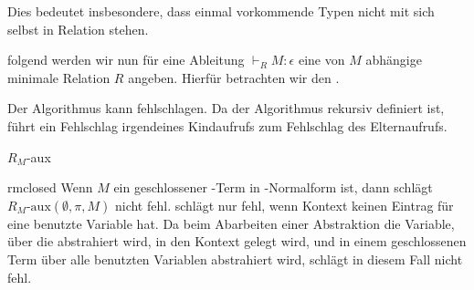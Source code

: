 \begin{remark}
    Dies bedeutet insbesondere, dass einmal vorkommende Typen nicht mit sich selbst in Relation stehen.
\end{remark}

 folgend werden wir nun für eine Ableitung $\vdash_R M : \epsilon$ eine von $M$ abhängige minimale Relation $R$ angeben. Hierfür betrachten wir den . 
\begin{remark}
    Der Algorithmus kann fehlschlagen. Da der Algorithmus rekursiv definiert ist, führt ein Fehlschlag irgendeines Kindaufrufs zum Fehlschlag des Elternaufrufs.
\end{remark}

\begin{algorithm}[t]
    \DontPrintSemicolon
\caption{$R_M$-aux}
\label{alg:rm}
\end{algorithm}

\begin{lemma}{}{rmclosed}
    Wenn $M$ ein geschlossener \tlambda-Term in \tbeta-Normalform ist, dann schlägt $R_M\text{-aux}(\emptyset,\pi,M)$ nicht fehl.
    \Proof
     schlägt nur fehl, wenn Kontext keinen Eintrag für eine benutzte Variable hat. Da beim Abarbeiten einer Abstraktion die Variable, über die abstrahiert wird, in den Kontext gelegt wird, und in einem geschlossenen Term über alle benutzten Variablen abstrahiert wird, schlägt  in diesem Fall nicht fehl.
\end{lemma}
    
